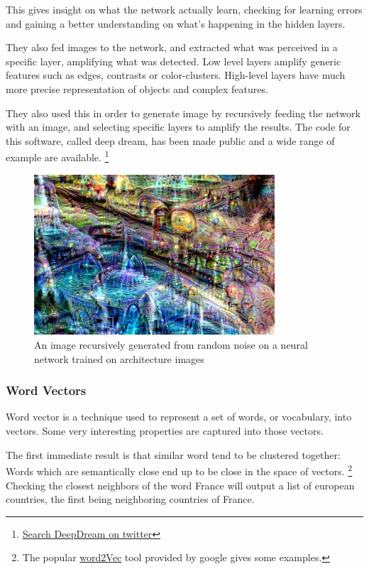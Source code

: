 \documentclass[12pt]{article}
\begin{document}
This gives insight on what the network actually learn, checking for learning errors
and gaining a better understanding on what's happening in the hidden layers.

They also fed images to the network, and extracted what was perceived in a
specific layer, amplifying what was detected. Low level layers amplify generic
features such as edges, contrasts or color-clusters. High-level layers have much
more precise representation of objects and complex features.

They also used this in order to generate image by recursively feeding the network with
an image, and selecting specific layers to amplify the results. The code for this
software, called deep dream, has been made public and a wide range of example are
available.
\footnote{\href{https://twitter.com/search?q=\%23deepdream&src=tyah\&lang=en}{Search DeepDream on twitter}}

\begin{figure}[ht]
    \centering
    \includegraphics[width=0.8\textwidth]{deepdream}
    \caption{An image recursively generated from random noise on a neural network trained on architecture images}
    \label{fig:deepdream}
\end{figure}

\pagebreak

\subsubsection{Word Vectors}

Word vector is a technique used to represent a set of words, or vocabulary, into
vectors. Some very interesting properties are captured into those vectors.

The first immediate result is that similar word tend to be clustered together:
Words which are semantically close end up to be close in the space of vectors.
\footnote{The popular \href{https://code.google.com/p/word2vec/}{word2Vec} tool provided by google gives some examples.}
Checking the closest neighbors of the word France will output a list of european
countries, the first being neighboring countries of France.\\
\end{document}
